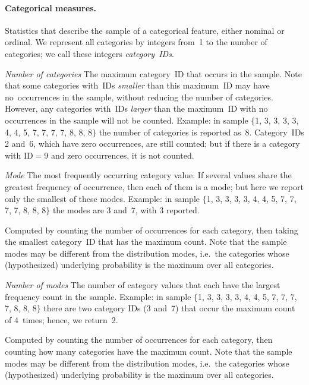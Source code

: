 \paragraph{Categorical measures.}  Statistics that describe the sample of
a categorical feature, either nominal or ordinal.  We represent all
categories by integers from~1 to the number of categories; we call
these integers \emph{category~IDs}.
\begin{Description}
\item[\it Number of categories]
\OutputRowText{\OutputRowIDNumCategories}
The maximum category~ID that occurs in the sample.  Note that some
categories with~IDs \emph{smaller} than this maximum~ID may have
no~occurrences in the sample, without reducing the number of categories.
However, any categories with~IDs \emph{larger} than the maximum~ID with
no occurrences in the sample will not be counted.
Example: in sample $\{$1, 3, 3, 3, 3, 4, 4, 5, 7, 7, 7, 7, 8, 8, 8$\}$
the number of categories is reported as~8.  Category~IDs 2 and~6, which have
zero occurrences, are still counted; but if there is a category with
ID${}=9$ and zero occurrences, it is not counted.
\item[\it Mode]
\OutputRowText{\OutputRowIDMode}
The most frequently occurring category value.
If several values share the greatest frequency of occurrence, then each
of them is a mode; but here we report only the smallest of these modes.
Example: in sample $\{$1, 3, 3, 3, 3, 4, 4, 5, 7, 7, 7, 7, 8, 8, 8$\}$
the modes are 3 and~7, with 3 reported.

Computed by counting the number of occurrences for each category,
then taking the smallest category~ID that has the maximum count.
Note that the sample modes may be different from the distribution modes,
i.e.\ the categories whose (hypothesized) underlying probability is the
maximum over all categories.
\item[\it Number of modes]
\OutputRowText{\OutputRowIDNumModes}
The number of category values that each have the largest frequency
count in the sample.  
Example: in sample $\{$1, 3, 3, 3, 3, 4, 4, 5, 7, 7, 7, 7, 8, 8, 8$\}$
there are two category IDs (3 and~7) that occur the maximum count of 4~times;
hence, we return~2.

Computed by counting the number of occurrences for each category,
then counting how many categories have the maximum count.
Note that the sample modes may be different from the distribution modes,
i.e.\ the categories whose (hypothesized) underlying probability is the
maximum over all categories.
\end{Description}


